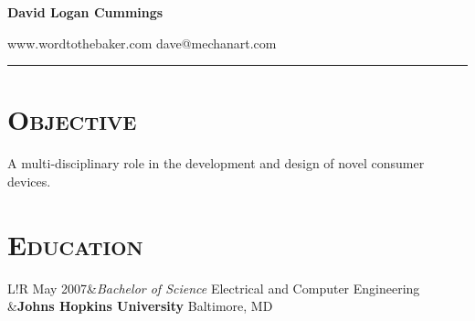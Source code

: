 \documentclass[10pt, letterpaper]{article}
\newcommand\VRule{\color{lightgray}\vrule width 0.5pt}
\begin{document}
\centerline{\large\bf David Logan Cummings}
www.wordtothebaker.com \hfill dave@mechanart.com
\vspace{1em}
\hrule height 1pt


\section*{\textsc{\textbf{Objective}}} A multi-disciplinary role in the development and design of novel
consumer devices. 


\section*{\textbf{\textsc{Education}}} 
\begin{tabular}{L!{\VRule}R}
  May 2007&{\sl Bachelor of Science}  \hfill Electrical and Computer Engineering \\
          &\textbf{Johns Hopkins University}  \hfill Baltimore, MD \\
\end{tabular}
\end{document}
